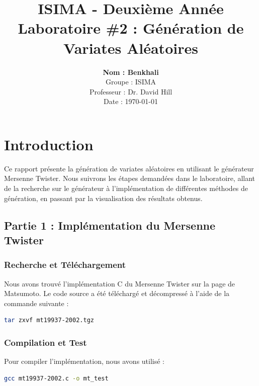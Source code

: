 \documentclass[a4paper,12pt]{report}
\title{
    \textbf{ISIMA - Deuxième Année}\\
    \vspace{1cm}
    \Huge Laboratoire \#2 : Génération de Variates Aléatoires
}
\author{
    \textbf{Nom : Benkhali}\\
    Groupe : ISIMA \\
    Professeur : Dr. David Hill \\
    Date : \today
}
\date{}
\begin{document}
\maketitle %

\newpage

\tableofcontents

\newpage

\chapter*{Introduction} %
Ce rapport présente la génération de variates aléatoires en utilisant le générateur Mersenne Twister. Nous suivrons les étapes demandées dans le laboratoire, allant de la recherche sur le générateur à l'implémentation de différentes méthodes de génération, en passant par la visualisation des résultats obtenus.

\newpage
\section*{Partie 1 : Implémentation du Mersenne Twister}

\subsection*{Recherche et Téléchargement}
Nous avons trouvé l'implémentation C du Mersenne Twister sur la page de Matsumoto. Le code source a été téléchargé et décompressé à l'aide de la commande suivante :

\begin{lstlisting}[language=bash]
tar zxvf mt19937-2002.tgz
\end{lstlisting}

\subsection*{Compilation et Test}
Pour compiler l'implémentation, nous avons utilisé :

\begin{lstlisting}[language=bash]
gcc mt19937-2002.c -o mt_test
\end{lstlisting}
\end{document}
